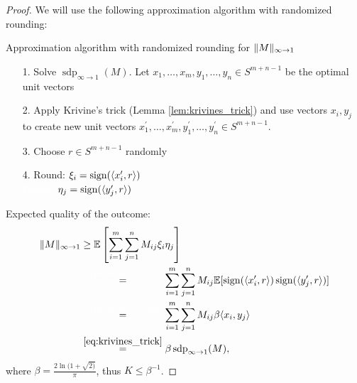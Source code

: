 	\begin{proof}
		We will use the following approximation algorithm with randomized rounding:
		
		\begin{algorithm}[H]
			\SetAlgoLined
			\caption{Approximation algorithm with randomized rounding for $ \Vert {M} \Vert_{\infty\to 1}$}
		\end{algorithm}
		\begin{itemize}
			\item[1.] Solve $\operatorname{sdp}_{\infty\to 1} (M)$. Let $x_1,\dots,x_m,y_1,\dots,y_n\in S^{m+n-1}$ be the optimal unit vectors
			\item[2.] Apply Krivine's trick (Lemma \ref{lem:krivines_trick}) and use vectors $x_i,y_j$ to create new unit vectors $x_1^\prime,\dots,x_m^\prime, y_1^\prime,\dots,y_n^\prime\in S^{m+n-1}$.
			\item[3.] Choose $r\in S^{m+n-1}$ randomly
			\item[4.] Round: $\xi_i = \operatorname{sign}(\langle{x_i^\prime},{r}\rangle)$\\
						\textcolor{white}{Round: }$\eta_j = \operatorname{sign}(\langle{y_j^\prime},{r}\rangle)$
		\end{itemize}
		
		\noindent Expected quality of the outcome:
		\begin{align*}
			\norm{M}_{\infty\to 1} &\geq \mathbb{E}\left[\sum_{i=1}^m\sum_{j=1}^n M_{ij}\xi_i\eta_j\right]\\
			&\overset{\textcolor{white}{\eqref*{eq:krivines_trick}}}{=} \sum_{i=1}^m\sum_{j=1}^n M_{ij} \mathbb{E}[\sgn(\sclr{x_i^\prime}{r}) \sgn(\sclr{y_j^\prime}{r})] \\
			&\overset{\textcolor{white}{\eqref*{eq:krivines_trick}}}{=}\sum_{i=1}^m\sum_{j=1}^n M_{ij}\beta \sclr{x_i}{y_j} \\
			&\overset{\eqref{eq:krivines_trick}}{=}\beta \operatorname{sdp}_{\infty\to 1}(M),
		\end{align*}
		where $\beta = \frac{2\ln(1+\sqrt{2)}}{\pi}$, thus $K\leq \beta^{-1}$.
	\end{proof}


